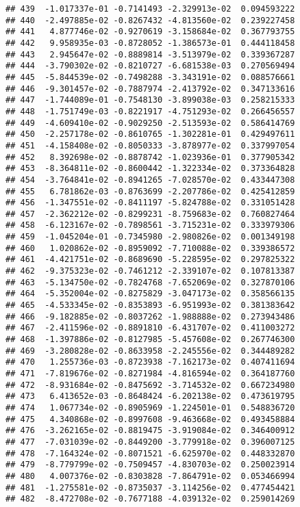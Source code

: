 \documentclass[
]{article}
\begin{document}
\begin{verbatim}
## 439  -1.017337e-01 -0.7141493 -2.329913e-02  0.094593222
## 440  -2.497885e-02 -0.8267432 -4.813560e-02  0.239227458
## 441   4.877746e-02 -0.9270619 -3.158684e-02  0.367793755
## 442   9.958935e-03 -0.8728052 -1.386573e-01  0.444118458
## 443   2.945647e-02 -0.8889814 -3.513979e-02  0.339367287
## 444  -3.790302e-02 -0.8210727 -6.681538e-03  0.270569494
## 445  -5.844539e-02 -0.7498288 -3.343191e-02  0.088576661
## 446  -9.301457e-02 -0.7887974 -2.413792e-02  0.347133616
## 447  -1.744089e-01 -0.7548130 -3.899038e-03  0.258215333
## 448  -1.751749e-03 -0.8221917 -4.751293e-02  0.266456557
## 449  -4.609410e-02 -0.9029250 -2.513593e-02  0.586414769
## 450  -2.257178e-02 -0.8610765 -1.302281e-01  0.429497611
## 451  -4.158408e-02 -0.8050333 -3.878977e-02  0.337997054
## 452   8.392698e-02 -0.8878742 -1.023936e-01  0.377905342
## 453  -8.364811e-02 -0.8600442 -1.322334e-02  0.373364828
## 454  -3.764841e-02 -0.8941265 -7.028570e-02  0.433447308
## 455   6.781862e-03 -0.8763699 -2.207786e-02  0.425412859
## 456  -1.347551e-02 -0.8411197 -5.824788e-02  0.331051428
## 457  -2.362212e-02 -0.8299231 -8.759683e-02  0.760827464
## 458  -6.123167e-02 -0.7898561 -3.715231e-02  0.333979306
## 459  -1.045204e-01 -0.7345980 -2.980826e-02  0.001349198
## 460   1.020862e-02 -0.8959092 -7.710088e-02  0.339386572
## 461  -4.421751e-02 -0.8689690 -5.228595e-02  0.297825322
## 462  -9.375323e-02 -0.7461212 -2.339107e-02  0.107813387
## 463  -5.134750e-02 -0.7824768 -7.652069e-02  0.327870106
## 464  -5.352004e-02 -0.8275829 -3.047173e-02  0.358566135
## 465  -4.533345e-02 -0.8353893 -6.951993e-02  0.381383642
## 466  -9.182885e-02 -0.8037262 -1.988888e-02  0.273943486
## 467  -2.411596e-02 -0.8891810 -6.431707e-02  0.411003272
## 468  -1.397886e-02 -0.8127985 -5.457608e-02  0.267746300
## 469  -3.280828e-02 -0.8633958 -2.245556e-02  0.344489282
## 470   1.255736e-03 -0.8723938 -7.162173e-02  0.407411694
## 471  -7.819676e-02 -0.8271984 -4.816594e-02  0.364187760
## 472  -8.931684e-02 -0.8475692 -3.714532e-02  0.667234980
## 473   6.413652e-03 -0.8648424 -6.202138e-02  0.473619795
## 474   1.067734e-02 -0.8905969 -1.224501e-01  0.548836720
## 475   4.340868e-02 -0.8997608 -9.463668e-02  0.493458884
## 476  -3.262165e-02 -0.8819475 -3.919084e-02  0.346400912
## 477  -7.031039e-02 -0.8449200 -3.779918e-02  0.396007125
## 478  -7.164324e-02 -0.8071521 -6.625970e-02  0.448332870
## 479  -8.779799e-02 -0.7509457 -4.830703e-02  0.250023914
## 480   4.007376e-02 -0.8303828 -7.864791e-02  0.053466994
## 481  -1.275581e-02 -0.8735037 -3.114256e-02  0.477454421
## 482  -8.472708e-02 -0.7677188 -4.039132e-02  0.259014269

\end{verbatim}
\end{document}

